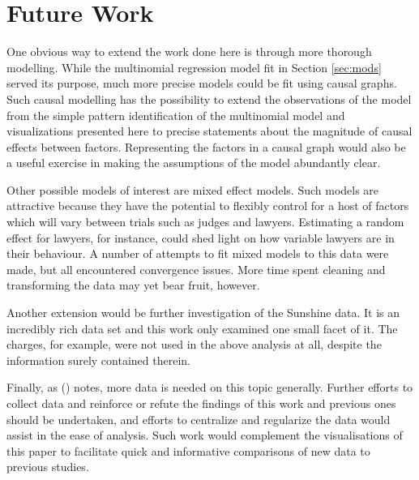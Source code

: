 \section{Future Work}
\label{sec:FutureWork}

One obvious way to extend the work done here is through more thorough modelling. While the multinomial regression model fit in
Section \ref{sec:mods} served its purpose, much more precise models could be fit using causal graphs. Such causal modelling has the
possibility to extend the observations of the model from the simple pattern identification of the multinomial model and
visualizations presented here to precise statements about the magnitude of causal effects between factors. Representing the
factors in a causal graph would also be a useful exercise in making the assumptions of the model abundantly clear.

Other possible models of interest are mixed effect models. Such models are attractive because they have the potential to flexibly control for a host of factors which will vary between trials such as judges and lawyers. Estimating a random effect for lawyers,
for instance, could shed light on how variable lawyers are in their behaviour. A number of attempts to fit mixed models to this data were made, but all encountered convergence issues. More time spent cleaning and transforming the data may yet bear fruit, however.

Another extension would be further investigation of the Sunshine data. It is an incredibly rich data set and this work only
examined one small facet of it. The charges, for example, were not used in the above analysis at all, despite the information surely contained therein.

Finally, as (\cite{JurySunshineProj}) notes, more data is needed on this topic generally. Further efforts to collect data and
reinforce or refute the findings of this work and previous ones should be undertaken, and efforts to centralize and regularize the
data would assist in the ease of analysis. Such work would complement the visualisations of
this paper to facilitate quick and informative comparisons of new data to previous studies.

